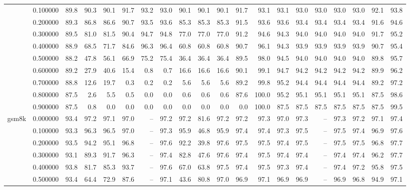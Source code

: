 \begin{tabular}{llrrrrrrrrrrrrrrrrrr}
 & 0.100000 & 89.8 & 90.3 & 90.1 & 91.7 & 93.2 & 93.0 & 90.1 & 90.1 & 90.1 & 91.7 & 93.1 & 93.1 & 93.0 & 93.0 & 93.0 & 93.0 & 92.1 & 93.8 \\
 & 0.200000 & 89.3 & 86.8 & 86.6 & 90.7 & 93.5 & 93.6 & 85.3 & 85.3 & 85.3 & 91.5 & 93.6 & 93.6 & 93.4 & 93.4 & 93.4 & 93.4 & 91.6 & 94.6 \\
 & 0.300000 & 89.5 & 81.0 & 81.5 & 90.4 & 94.7 & 94.8 & 77.0 & 77.0 & 77.0 & 91.2 & 94.6 & 94.3 & 94.0 & 94.0 & 94.0 & 94.0 & 91.7 & 95.2 \\
 & 0.400000 & 88.9 & 68.5 & 71.7 & 84.6 & 96.3 & 96.4 & 60.8 & 60.8 & 60.8 & 90.7 & 96.1 & 94.3 & 93.9 & 93.9 & 93.9 & 93.9 & 90.7 & 95.4 \\
 & 0.500000 & 88.2 & 47.8 & 56.1 & 66.9 & 75.2 & 75.4 & 36.4 & 36.4 & 36.4 & 89.5 & 98.0 & 94.5 & 94.0 & 94.0 & 94.0 & 94.0 & 89.8 & 95.7 \\
 & 0.600000 & 89.2 & 27.9 & 40.6 & 15.4 & 0.8 & 0.7 & 16.6 & 16.6 & 16.6 & 90.1 & 99.1 & 94.7 & 94.2 & 94.2 & 94.2 & 94.2 & 89.9 & 96.2 \\
 & 0.700000 & 88.8 & 12.6 & 19.7 & 0.3 & 0.2 & 0.2 & 5.6 & 5.6 & 5.6 & 89.2 & 99.8 & 95.2 & 94.4 & 94.4 & 94.4 & 94.4 & 89.2 & 97.2 \\
 & 0.800000 & 87.5 & 2.6 & 5.5 & 0.5 & 0.0 & 0.0 & 0.6 & 0.6 & 0.6 & 87.6 & 100.0 & 95.2 & 95.1 & 95.1 & 95.1 & 95.1 & 87.5 & 98.6 \\
 & 0.900000 & 87.5 & 0.8 & 0.0 & 0.0 & 0.0 & 0.0 & 0.0 & 0.0 & 0.0 & 0.0 & 100.0 & 87.5 & 87.5 & 87.5 & 87.5 & 87.5 & 87.5 & 99.5 \\
\cline{1-20}
\multirow[t]{10}{*}{gsm8k} & 0.000000 & 93.4 & 97.2 & 97.1 & 97.0 & -- & 97.2 & 97.2 & 81.6 & 97.2 & 97.2 & 97.3 & 97.0 & 97.3 & -- & 97.3 & 97.2 & 97.1 & 97.4 \\
 & 0.100000 & 93.3 & 96.3 & 96.5 & 97.0 & -- & 97.3 & 95.9 & 46.8 & 95.9 & 97.4 & 97.4 & 97.3 & 97.5 & -- & 97.5 & 97.4 & 96.9 & 97.6 \\
 & 0.200000 & 93.5 & 94.2 & 95.1 & 96.8 & -- & 97.6 & 92.2 & 39.8 & 97.6 & 97.5 & 97.5 & 97.4 & 97.5 & -- & 97.5 & 97.5 & 96.8 & 97.7 \\
 & 0.300000 & 93.1 & 89.3 & 91.7 & 96.3 & -- & 97.4 & 82.8 & 47.6 & 97.6 & 97.4 & 97.5 & 97.4 & 97.4 & -- & 97.4 & 97.4 & 96.2 & 97.7 \\
 & 0.400000 & 93.8 & 81.7 & 85.3 & 93.7 & -- & 97.6 & 67.0 & 63.8 & 97.5 & 97.4 & 97.5 & 97.3 & 97.4 & -- & 97.4 & 97.2 & 95.8 & 97.5 \\
 & 0.500000 & 93.4 & 64.4 & 72.9 & 87.6 & -- & 97.1 & 43.6 & 80.8 & 97.0 & 96.9 & 97.1 & 96.9 & 96.9 & -- & 96.9 & 96.8 & 94.9 & 97.1 \\

\end{tabular}
